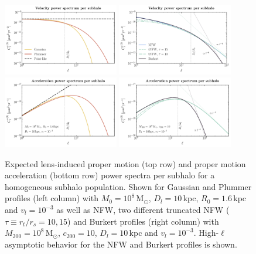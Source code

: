 \documentclass[prd,aps,10pt,nofootinbib,twocolumn,superscriptaddress,preprintnumbers,balancelastpage,longbibliography]{revtex4-1}
\begin{document}
\begin{figure}[htbp]
  \centering
  \includegraphics[width=0.45\textwidth]{plots/mu_single_1}
  \includegraphics[width=0.45\textwidth]{plots/mu_single_2}
  \includegraphics[width=0.45\textwidth]{plots/alpha_single_1}
  \includegraphics[width=0.45\textwidth]{plots/alpha_single_2}
  \caption{Expected lens-induced proper motion (top row) and proper motion acceleration (bottom row) power spectra per subhalo for a homogeneous subhalo population. Shown for Gaussian and Plummer profiles (left column) with $M_0 = 10^{8}$\,M$_\odot$, $D_l=10$\,kpc, $R_0=1.6$\,kpc and $v_l=10^{-3}$ as well as NFW, two different truncated NFW ($\tau \equiv r_t/r_s = 10, 15$) and Burkert profiles (right column) with $M_{200}=10^{8}$\,M$_\odot$, $c_{200}=10$, $D_l=10$\,kpc and $v_l=10^{-3}$. High-$\ell$ asymptotic behavior for the NFW and Burkert profiles is shown.} 
  \label{fig:single_sub}
\end{figure}
\end{document}
